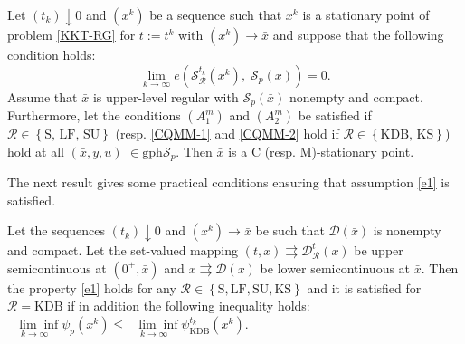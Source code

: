\begin{theorem}\label{ConvergenceResult}
	Let $(t_{k}) \downarrow 0$ and $(x^{k})$ be a sequence such that $x^k$ is a stationary point of problem \eqref{KKT-RG} for $t:=t^k$ with $(x^{k})\rightarrow \bar{x}$ and suppose that the following condition holds: 
 \begin{equation}
	\underset{k \rightarrow
		\infty}{\lim }e\left(\mathcal{S}^{t_{k}}_\mathcal{R}(x^{k}), \;\mathcal{S}_{p}(\bar{x})\right) = 0.\label{e1}
	\end{equation}
  Assume that $\bar{x}$ is upper-level regular with  $\mathcal{S}_{p}(\bar{x})$ 
	nonempty and compact. Furthermore, let the 
conditions $(A_{1}^{m})$ and $(A_{2}^{m})$ be satisfied if $\mathcal{R}\in  \left\{\mbox{S},\, \mbox{LF}, \, \mbox{SU}\right\} $  (resp. \eqref{CQMM-1} and \eqref{CQMM-2} hold if  $\mathcal{R}\in  \left\{\mbox{KDB}, \, \mbox{KS}\right\}$) hold at all $(\bar{x},y,u)$ $\in\mathrm{gph}\mathcal{S}_{p}$. 	
	Then $\bar{x}$ is a C (resp. M)-stationary point.
\end{theorem}

The next result gives some practical conditions ensuring that assumption \eqref{e1} is satisfied.
\begin{proposition} \label{cs}
Let the sequences $(t_{k})\downarrow0$ and $(x^{k}) \rightarrow \bar{x}$ be such that $\mathcal{D}(\bar{x})$ is
nonempty and compact. Let the set-valued mapping $(t,x) \rightrightarrows \mathcal{D}_\mathcal{R}^{t}(x)$ be  upper semicontinuous at $(0^+,\bar{x})$ and $x \rightrightarrows \mathcal{D}(x)$  be lower semicontinuous at $\bar{x}$. Then the property \eqref{e1} holds for any $\mathcal{R}\in \left\{\mbox{S}, \mbox{LF}, \mbox{SU}, \mbox{KS}\right\}$ and it is satisfied for $\mathcal{R} = \text{KDB}$ if in addition the following inequality holds: $\underset{k\rightarrow\infty}{\text{ }\lim\inf}\psi_{p}(x^{k})\leq \underset
{k\rightarrow\infty}{\text{ }\lim\inf}\psi_{\text{KDB}}^{t_{k}}(x^{k})$.
\end{proposition}
